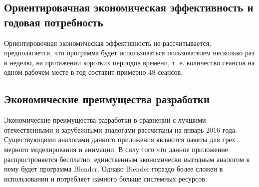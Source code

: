 \subsection{Ориентировачная экономическая эффективность и годовая потребность}
Ориентировочная экономическая эффективность не рассчитывается, предполагается, что программа будет использоваться пользователем несколько раз в неделю, на протяжении коротких периодов времени, т. е. количество сеансов на одном рабочем месте в год составит примерно 48 сеансов.

\subsection{Экономические преимущества разработки}
Экономические преимущества разработки в сравнении с лучшими отечественными и зарубежными аналогами рассчитаны на январь 2016 года. Существующими аналогами данного приложения являются пакеты для трех мерного моделирования и анимации. В силу того что данное приложение распростроняется бесплатно, единственным экономически выгодным аналогом к нему будет программа Blender. Однако Blender гораздо более сложен в использовании и потребляет намного больше системных ресурсов.
